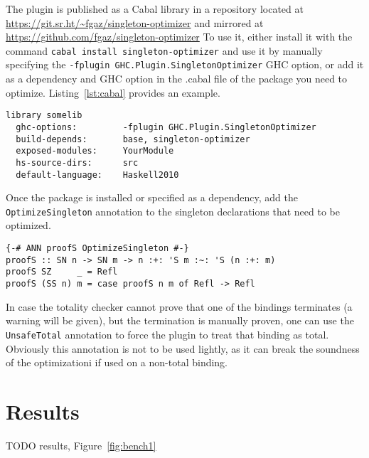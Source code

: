 The plugin is published as a Cabal library in a repository located at \url{https://git.sr.ht/~fgaz/singleton-optimizer} and mirrored at \url{https://github.com/fgaz/singleton-optimizer}
To use it, either install it with the command \texttt{cabal install singleton-optimizer} and use it by manually specifying the \texttt{-fplugin GHC.Plugin.SingletonOptimizer} GHC option, or add it as a dependency and GHC option in the .cabal file of the package you need to optimize.
Listing~\ref{lst:cabal} provides an example.

\begin{lstlisting}[label=lst:cabal, caption=Example .cabal stanza]
library somelib
  ghc-options:         -fplugin GHC.Plugin.SingletonOptimizer
  build-depends:       base, singleton-optimizer
  exposed-modules:     YourModule
  hs-source-dirs:      src
  default-language:    Haskell2010
\end{lstlisting}

Once the package is installed or specified as a dependency, add the \texttt{OptimizeSingleton} annotation to the singleton declarations that need to be optimized.

\begin{lstlisting}[caption=Optimizing \texttt{proofS}]
{-# ANN proofS OptimizeSingleton #-}
proofS :: SN n -> SN m -> n :+: 'S m :~: 'S (n :+: m)
proofS SZ     _ = Refl
proofS (SS n) m = case proofS n m of Refl -> Refl
\end{lstlisting}

In case the totality checker cannot prove that one of the bindings terminates (a warning will be given), but the termination is manually proven, one can use the \texttt{UnsafeTotal} annotation to force the plugin to treat that binding as total.
Obviously this annotation is not to be used lightly, as it can break the soundness of the optimizationi if used on a non-total binding.

\chapter{Results}
\label{cha:results}

TODO results, Figure~\ref{fig:bench1}

